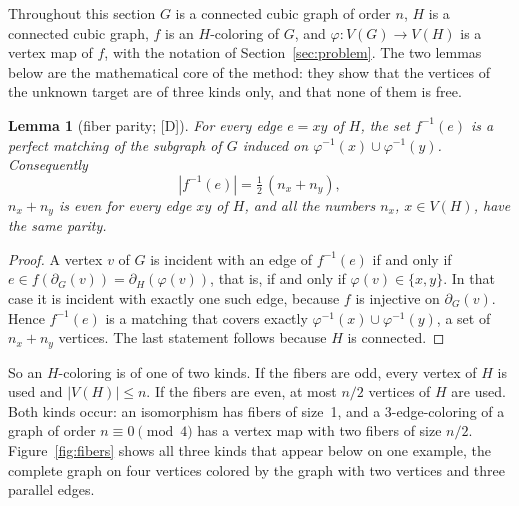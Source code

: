 \documentclass[11pt]{article}
\newtheorem{lemma}[theorem]{Lemma}
\theoremstyle{definition}
\theoremstyle{remark}
\newcommand{\evD}{\textnormal{[D]}}
\begin{document}
Throughout this section $G$ is a connected cubic graph of order $n$, $H$ is a connected cubic graph, $f$ is an
$H$-coloring of $G$, and $\varphi : V(G) \to V(H)$ is a vertex map of $f$, with the notation of
Section~\ref{sec:problem}. The two lemmas below are the mathematical core of the method: they show that the
vertices of the unknown target are of three kinds only, and that none of them is free.

\begin{lemma}[fiber parity; \evD]\label{lem:parity}
For every edge $e = xy$ of $H$, the set $f^{-1}(e)$ is a perfect matching of the subgraph of $G$
induced on $\varphi^{-1}(x) \cup \varphi^{-1}(y)$. Consequently
\begin{equation}\label{eq:parity}
|f^{-1}(e)| = \tfrac12\,(n_x + n_y),
\end{equation}
$n_x + n_y$ is even for every edge $xy$ of $H$, and all the numbers $n_x$, $x \in V(H)$, have the same parity.
\end{lemma}

\begin{proof}
A vertex $v$ of $G$ is incident with an edge of $f^{-1}(e)$ if and only if
$e \in f(\partial_G(v)) = \partial_H(\varphi(v))$, that is, if and only if
$\varphi(v) \in \{x, y\}$. In that case it is incident with exactly one such edge, because $f$ is
injective on $\partial_G(v)$. Hence $f^{-1}(e)$ is a matching that covers exactly
$\varphi^{-1}(x) \cup \varphi^{-1}(y)$, a set of $n_x + n_y$ vertices. The last statement follows
because $H$ is connected.
\end{proof}

So an $H$-coloring is of one of two kinds. If the fibers are odd, every vertex of $H$ is used and
$|V(H)| \le n$. If the fibers are even, at most $n/2$ vertices of $H$ are used. Both kinds occur:
an isomorphism has fibers of size~1, and a 3-edge-coloring of a graph of order $n \equiv 0
\pmod 4$ has a vertex map with two fibers of size $n/2$. Figure~\ref{fig:fibers} shows all three kinds that
appear below on one example, the complete graph on four vertices colored by the graph with two vertices and three
parallel edges.
\end{document}
